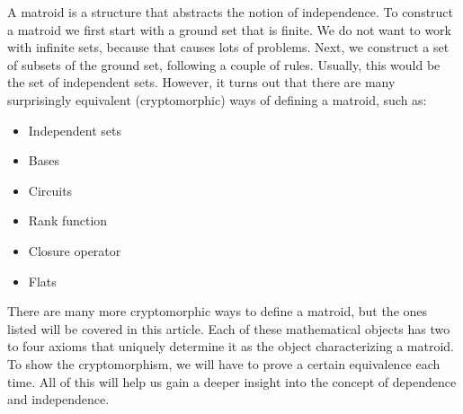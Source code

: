 A matroid is a structure that abstracts the notion of independence. To construct a matroid we first start with a ground set that is finite. We do not want to work with infinite sets, because that causes lots of problems. Next, we construct a set of subsets of the ground set, following a couple of rules. Usually, this would be the set of independent sets. However, it turns out that there are many surprisingly equivalent (cryptomorphic) ways of defining a matroid, such as:
\begin{itemize}
    \item Independent sets
    \item Bases
    \item Circuits
    \item Rank function
    \item Closure operator
    \item Flats
\end{itemize}

There are many more cryptomorphic ways to define a matroid, but the ones listed will be covered in this article. Each of these mathematical objects has two to four axioms that uniquely determine it as the object characterizing a matroid. To show the cryptomorphism, we will have to prove a certain equivalence each time. All of this will help us gain a deeper insight into the concept of dependence and independence.